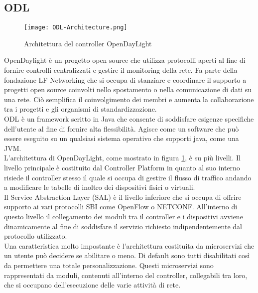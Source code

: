 \subsection{ODL}
\begin{figure}[h]
    \centering
   \texttt{[image: ODL-Architecture.png]}
    \caption{Architettura del controller OpenDayLight}
    \label{fig:ArchODL}
\end{figure}
OpenDaylight \cite{ODL} è un progetto open source che utilizza protocolli aperti al fine di fornire controlli centralizzati e gestire il monitoring della rete.
Fa parte della fondazione LF Networking \cite{LFN} che si occupa di stanziare e coordinare il supporto a progetti open source coinvolti nello spostamento o nella comunicazione di dati su una rete.
Ciò semplifica il coinvolgimento dei membri e aumenta la collaborazione tra i progetti e gli organismi di standardizzazione.
\\ODL è un framework scritto in Java che consente di soddisfare esigenze specifiche dell'utente al fine di fornire alta flessibilità. Agisce come un software che può essere eseguito su un qualsiasi sistema operativo che supporti java, come una JVM.
\\L'architettura di OpenDayLight, come mostrato in figura \ref{fig:ArchODL}, è su più livelli. 
Il livello principale è costituito dal Controller Platform in quanto al suo interno risiede il controller stesso il quale si 
occupa di gestire il flusso di traffico andando a modificare le tabelle di inoltro dei dispositivi fisici o virtuali. 
\\Il Service Abstraction Layer (SAL) è il livello inferiore che si occupa di offrire supporto ai vari protocolli SBI come OpenFlow o NETCONF. 
All'interno di questo livello il collegamento dei moduli tra il controller e i dispositivi avviene dinamicamente al fine di soddisfare il servizio richiesto indipendentemente dal protocollo utilizzato.
\\Una caratteristica molto impostante è l'architettura costituita da microservizi che un utente può decidere se abilitare o meno. 
Di default sono tutti disabilitati così da permettere una totale personalizzazione.
Questi microservizi sono rappresentati da moduli, contenuti all'interno del controller, collegabili tra loro, che si occupano dell'esecuzione delle varie attività di rete.
